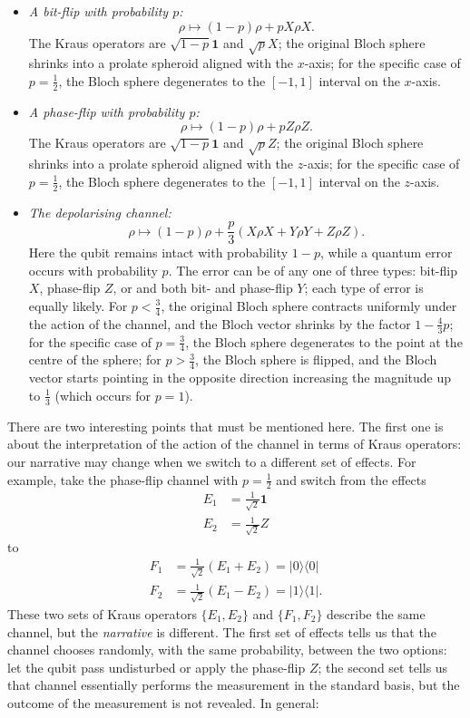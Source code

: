 \documentclass[fleqn]{article}
\begin{document}
\begin{itemize}
\item
  \emph{A bit-flip with probability \(p\):}
  \[
      \rho \longmapsto (1-p)\rho+pX\rho X.
    \]
  The Kraus operators are \(\sqrt{1-p}\mathbf{1}\) and \(\sqrt{p}X\);
  the original Bloch sphere shrinks into a prolate spheroid aligned with the \(x\)-axis;
  for the specific case of \(p=\frac{1}{2}\), the Bloch sphere degenerates to the \([-1,1]\) interval on the \(x\)-axis.
\item
  \emph{A phase-flip with probability \(p\):}
  \[
      \rho \longmapsto (1-p)\rho+pZ\rho Z.
    \]
  The Kraus operators are \(\sqrt{1-p}\mathbf{1}\) and \(\sqrt{p}Z\);
  the original Bloch sphere shrinks into a prolate spheroid aligned with the \(z\)-axis;
  for the specific case of \(p=\frac{1}{2}\), the Bloch sphere degenerates to the \([-1,1]\) interval on the \(z\)-axis.
\item
  \emph{The depolarising channel:}
  \[
      \rho\longmapsto (1-p)\rho + \frac{p}{3}\left(X\rho X+Y\rho Y+Z\rho Z\right).
    \]
  Here the qubit remains intact with probability \(1-p\), while a quantum error occurs with probability \(p\).
  The error can be of any one of three types: bit-flip \(X\), phase-flip \(Z\), or and both bit- and phase-flip \(Y\); each type of error is equally likely.
  For \(p<\frac{3}{4}\), the original Bloch sphere contracts uniformly under the action of the channel, and the Bloch vector shrinks by the factor \(1-\frac{4}{3}p\);
  for the specific case of \(p=\frac{3}{4}\), the Bloch sphere degenerates to the point at the centre of the sphere;
  for \(p>\frac{3}{4}\), the Bloch sphere is flipped, and the Bloch vector starts pointing in the opposite direction increasing the magnitude up to \(\frac{1}{3}\) (which occurs for \(p=1\)).
\end{itemize}

There are two interesting points that must be mentioned here.
The first one is about the interpretation of the action of the channel in terms of Kraus operators: our narrative may change when we switch to a different set of effects.
For example, take the phase-flip channel with \(p=\frac{1}{2}\) and switch from the effects
\[
  \begin{aligned}
    E_1 &= \frac{1}{\sqrt{2}}\mathbf{1}
  \\E_2 &= \frac{1}{\sqrt{2}}Z
  \end{aligned}
\]
to
\[
  \begin{aligned}
    F_1 &= \frac{1}{\sqrt{2}}(E_1+E_2)=|0\rangle\langle 0|
  \\F_2 &= \frac{1}{\sqrt{2}}(E_1-E_2)=|1\rangle\langle 1|.
  \end{aligned}
\]
These two sets of Kraus operators \(\{E_1,E_2\}\) and \(\{F_1,F_2\}\) describe the same channel, but the \emph{narrative} is different.
The first set of effects tells us that the channel chooses randomly, with the same probability, between the two options: let the qubit pass undisturbed or apply the phase-flip \(Z\);
the second set tells us that channel essentially performs the measurement in the standard basis, but the outcome of the measurement is not revealed.
In general:
\end{document}

